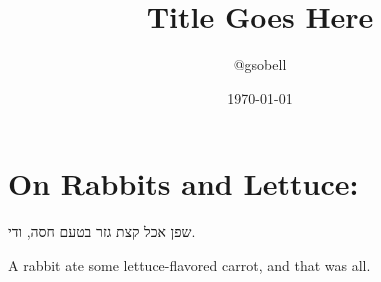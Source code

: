 \documentclass[11pt]{article}
\title{\textbf{Title Goes Here}}
\author{@gsobell}
\date{\today}
\begin{document}
{}


\section{On Rabbits and Lettuce:}
\begin{multicols}{2}
\begin{flushright}
\texthebrew{שפן אכל קצת גזר בטעם חסה, ודי.}
 \end{flushright}
A rabbit ate some lettuce-flavored carrot, and that was all.
\end{multicols}
\end{document}
